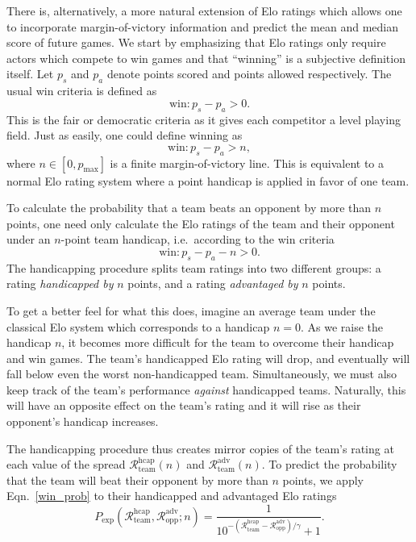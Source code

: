 \documentclass[aps,prc,reprint,amsmath,superscriptaddress]{revtex4-1}
\newcommand{\R}{\mathcal{R}}
\begin{document}
There is, alternatively, a more natural extension of Elo ratings which allows one to incorporate margin-of-victory information and predict the mean and median score of future games.
We start by emphasizing that Elo ratings only require actors which compete to win games and that ``winning'' is a subjective definition itself.
Let $p_s$ and $p_a$ denote points scored and points allowed respectively.
The usual win criteria is defined as
\begin{equation}
  \text{win}: p_s - p_a > 0.
\end{equation}
This is the fair or democratic criteria as it gives each competitor a level playing field.
Just as easily, one could define winning as
\begin{equation}
  \text{win}: p_s - p_a > n,
\end{equation}
where $n \in [0, p_\text{max}]$ is a finite margin-of-victory line.
This is equivalent to a normal Elo rating system where a point handicap is applied in favor of one team.

To calculate the probability that a team beats an opponent by more than $n$ points, one need only calculate the Elo ratings of the team and their opponent under an $n$-point team handicap, i.e.\ according to the win criteria
\begin{equation}
  \text{win}: p_s - p_a - n > 0.
\end{equation}
The handicapping procedure splits team ratings into two different groups: a rating \emph{handicapped by} $n$ points, and a rating \emph{advantaged by} $n$ points.

To get a better feel for what this does, imagine an average team under the classical Elo system which corresponds to a handicap $n=0$. 
As we raise the handicap $n$, it becomes more difficult for the team to overcome their handicap and win games.
The team's handicapped Elo rating will drop, and eventually will fall below even the worst non-handicapped team.
Simultaneously, we must also keep track of the team's performance \emph{against} handicapped teams.
Naturally, this will have an opposite effect on the team's rating and it will rise as their opponent's handicap increases.

The handicapping procedure thus creates mirror copies of the team's rating at each value of the spread $\R_\text{team}^\text{hcap}(n)$ and $\R_\text{team}^\text{adv}(n)$.
To predict the probability that the team will beat their opponent by more than $n$ points, we apply Eqn.~\eqref{win_prob} to their handicapped and advantaged Elo ratings
\begin{equation}
  P_\text{exp}(\R_\text{team}^\text{hcap}, \R_\text{opp}^\text{adv}; n) = \frac{1}{10^{-(\R_\text{team}^\text{hcap} - \R_\text{opp}^\text{adv})/\gamma} + 1}.
\end{equation}
\end{document}
